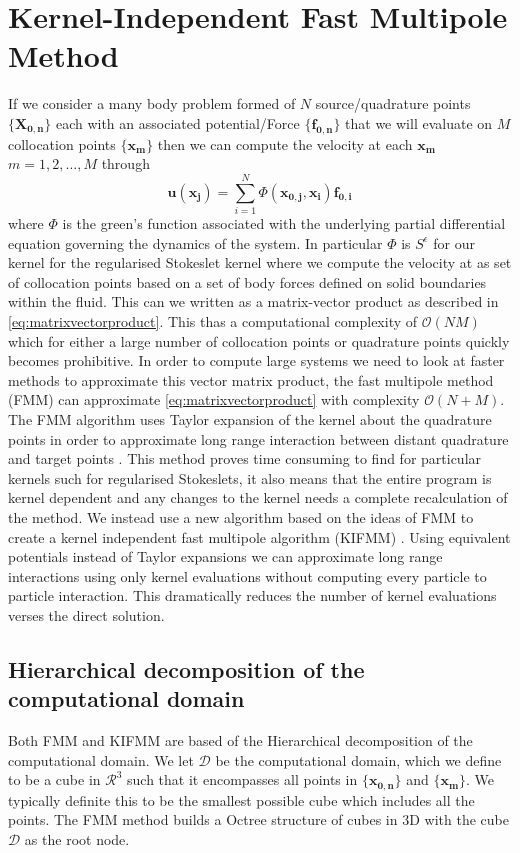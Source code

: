 \section{Kernel-Independent Fast Multipole Method}
If we consider a many body problem formed of $N$ source/quadrature points $\{\mathbf{X_{0,n}}\}$ each with an associated potential/Force $\{\mathbf{f_{0,n}}\}$ that we will evaluate on $M$ collocation points $\{\mathbf{x_m}\}$ then we can compute the velocity at each $\mathbf{x_m}$ $m=1,2,\dots,M$ through
\begin{equation*}
    \mathbf{u}(\mathbf{x_j}) = \sum_{i=1}^N \Phi(\mathbf{x_{0,j}},\mathbf{x_i})\mathbf{f_{0,i}}
\end{equation*}
where $\Phi$ is the green's function associated with the underlying partial differential equation governing the dynamics of the system. In particular $\Phi$ is $S^\epsilon$ for our kernel for the regularised Stokeslet kernel where we compute the velocity at as set of collocation points based on a set of body forces defined on solid boundaries within the fluid. This can we written as a matrix-vector product as described in \cref{eq:matrixvectorproduct}. This thas a computational complexity of $\mathcal{O}(NM)$ which for either a large number of collocation points or quadrature points quickly becomes prohibitive. In order to compute large systems we need to look at faster methods to approximate this vector matrix product, the fast multipole method (FMM) can approximate \cref{eq:matrixvectorproduct} with complexity $\mathcal{O}(N+M)$. The FMM algorithm uses Taylor expansion of the kernel about the quadrature points in order to approximate long range interaction between distant quadrature and target points \cite{Beatson1997AMethods,Tornberg2008,Wang2007AEquations,Yokota}. This method proves time consuming to find for particular kernels such for regularised Stokeslets, it also means that the entire program is kernel dependent and any changes to the kernel needs a complete recalculation of the method.
We instead use a new algorithm based on the ideas of FMM to create a kernel independent fast multipole algorithm (KIFMM) \cite{Ying2004, Ying2005,Rostami2016Kernel-independentStokeslets,Yan}. Using equivalent potentials instead of Taylor expansions we can approximate long range interactions using only kernel evaluations without computing every particle to particle interaction. This dramatically reduces the number of kernel evaluations verses the direct solution. 
\subsection{Hierarchical decomposition of the computational domain}
Both FMM and KIFMM are based of the Hierarchical decomposition of the computational domain. We let $\mathcal{D}$ be the computational domain, which we define to be a cube in $\mathcal{R}^3$ such that it encompasses all points in $\{\mathbf{x_{0,n}}\}$ and $\{\mathbf{x_m}\}$. We typically definite this to be the smallest possible cube which includes all the points. The FMM method builds a Octree structure of cubes in 3D with the cube $\mathcal{D}$ as the root node.  
